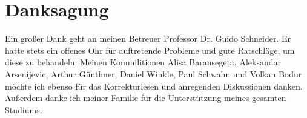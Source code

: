 \section*{Danksagung}

Ein großer Dank geht an meinen Betreuer Professor Dr. Guido Schneider. Er hatte stets ein offenes Ohr für auftretende Probleme und gute Ratschläge, um diese zu behandeln.
Meinen Kommilitionen Alisa Baransegeta, Aleksandar Arsenijevic, Arthur Günthner, Daniel Winkle, Paul Schwahn und Volkan Bodur möchte ich ebenso für das Korrekturlesen und anregenden Diskussionen danken.
Außerdem danke ich meiner Familie für die Unterstützung meines gesamten Studiums.
